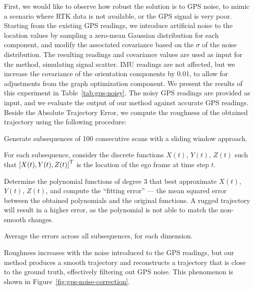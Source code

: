 First, we would like to observe how robust the solution is to GPS noise, to mimic a scenario where RTK data is not available, or the GPS signal is very poor. Starting from the existing GPS readings, we introduce artificial noise to the location values by sampling a zero-mean Gaussian distribution for each component, and modify the associated covariance based on the $\sigma$ of the noise distribution. The resulting readings and covariance values are used as input for the method, simulating signal scatter. IMU readings are not affected, but we increase the covariance of the orientation components by 0.01, to allow for adjustments from the graph optimization component. We present the results of this experiment in Table~\ref{tab:gps-noisy}. The noisy GPS readings are provided as input, and we evaluate the output of our method against accurate GPS readings. Beside the Absolute Trajectory Error, we compute the roughness of the obtained trajectory using the following procedure:
\begin{compactenum}
    \item Generate subsequences of 100 consecutive scans with a sliding window approach.
    \item For each subsequence, consider the discrete functions $X(t)$, $Y(t)$, $Z(t)$ such that ${\left[X(t), Y(t), Z(t)\right]}^\text{T}$ is the location of the ego frame at time step $t$.
    \item Determine the polynomial functions of degree 3 that best approximate $X(t)$, $Y(t)$, $Z(t)$, and compute the ``fitting error'' --- the mean squared error between the obtained polynomials and the original functions. A rugged trajectory will result in a higher error, as the polynomial is not able to match the non-smooth changes.
    \item Average the errors across all subsequences, for each dimension.
\end{compactenum}
Roughness increases with the noise introduced to the GPS readings, but our method produces a smooth trajectory and reconstructs a trajectory that is close to the ground truth, effectively filtering out GPS noise. This phenomenon is shown in Figure~\ref{fig:gps-noise-correction}.


